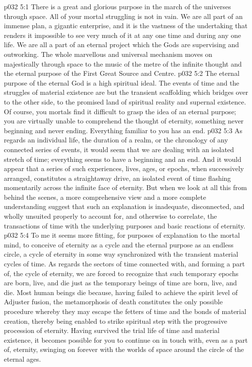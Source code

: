 \vs p032 5:1 There is a great and glorious purpose in the march of the universes through space. All of your mortal struggling is not in vain. We are all part of an immense plan, a gigantic enterprise, and it is the vastness of the undertaking that renders it impossible to see very much of it at any one time and during any one life. We are all a part of an eternal project which the Gods are supervising and outworking. The whole marvellous and universal mechanism moves on majestically through space to the music of the metre of the infinite thought and the eternal purpose of the First Great Source and Centre.
\vs p032 5:2 The eternal purpose of the eternal God is a high spiritual ideal. The events of time and the struggles of material existence are but the transient scaffolding which bridges over to the other side, to the promised land of spiritual reality and supernal existence. Of course, you mortals find it difficult to grasp the idea of an eternal purpose; you are virtually unable to comprehend the thought of eternity, something never beginning and never ending. Everything familiar to you has an end.
\vs p032 5:3 \pc As regards an individual life, the duration of a realm, or the chronology of any connected series of events, it would seem that we are dealing with an isolated stretch of time; everything seems to have a beginning and an end. And it would appear that a series of such experiences, lives, ages, or epochs, when successively arranged, constitutes a straightaway drive, an isolated event of time flashing momentarily across the infinite face of eternity. But when we look at all this from behind the scenes, a more comprehensive view and a more complete understanding suggest that such an explanation is inadequate, disconnected, and wholly unsuited properly to account for, and otherwise to correlate, the transactions of time with the underlying purposes and basic reactions of eternity.
\vs p032 5:4 To me it seems more fitting, for purposes of explanation to the mortal mind, to conceive of eternity as a cycle and the eternal purpose as an endless circle, a cycle of eternity in some way synchronized with the transient material cycles of time. As regards the sectors of time connected with, and forming a part of, the cycle of eternity, we are forced to recognize that such temporary epochs are born, live, and die just as the temporary beings of time are born, live, and die. Most human beings die because, having failed to achieve the spirit level of Adjuster fusion, the metamorphosis of death constitutes the only possible procedure whereby they may escape the fetters of time and the bonds of material creation, thereby being enabled to strike spiritual step with the progressive procession of eternity. Having survived the trial life of time and material existence, it becomes possible for you to continue on in touch with, even as a part of, eternity, swinging on forever with the worlds of space around the circle of the eternal ages.
